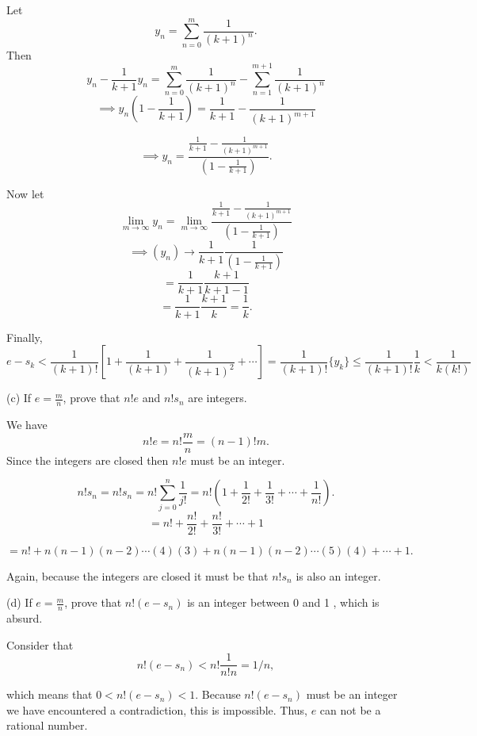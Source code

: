 \documentclass{report}
\begin{document}
\begin{myproof}
  Let $$ y_n = \sum_{n=0}^{m} \frac{1}{(k+1)^n} .$$ Then $$y_n - \frac{1}{k+1} y_n = \sum_{n=0}^{m} \frac{1}{(k+1)^n} - \sum_{n=1}^{m+1} \frac{1}{(k+1)^n} $$ 
  $$\implies y_n\left(1 - \frac{1}{k+1}\right) = \frac{1}{k+1} - \frac{1}{(k+1)^{m+1}} $$   

$$\implies y_n = \frac{\frac{1}{k+1} - \frac{1}{(k+1)^{m+1}}}{\left(1 - \frac{1}{k+1}\right)}.$$


Now let $$ \lim_{m \rightarrow \infty} y_n = \lim_{m \rightarrow \infty}\frac{\frac{1}{k+1} - \frac{1}{(k+1)^{m+1}}}{\left(1 - \frac{1}{k+1}\right)}$$
$$ \implies (y_n) \rightarrow \frac{1}{k+1}\frac{1}{\left(1 - \frac{1}{k+1}\right)}$$
$$  = \frac{1}{k+1}\frac{k+1}{k+1-1}$$
$$  = \frac{1}{k+1}\frac{k+1}{k} = \frac{1}{k}.$$


Finally, $$ e - s_k  < \frac{1}{(k+1)!}\left[1 + \frac{1}{(k+1)}  + \frac{1}{(k+1)^2} + \cdots \right] = \frac{1}{(k+1)!}\{y_k\} \leq \frac{1}{(k+1)!} \frac{1}{k} < \frac{1}{k(k!)}$$
\end{myproof}

\bigskip

(c) If $e=\frac{m}{n}$, prove that $n ! e$ and $n ! s_n$ are integers.

\begin{myproof}

We have $$ n!e = n!\frac{m}{n} = (n-1)!m.$$ Since the integers are closed then $n!e$ must be an integer. 
    
\end{myproof}

\begin{myproof}

$$ n!s_n = n!s_n= n!\sum_{j=0}^n \frac{1}{j!} = n!\left(1 + \frac{1}{2!} + \frac{1}{3!}+ \cdots +\frac{1}{n!}\right) .$$
$$ = n! + \frac{n!}{2!} + \frac{n!}{3!}+ \cdots + 1$$

$$ = n! + n(n-1)(n-2)\cdots(4)(3) + n(n-1)(n-2)\cdots(5)(4)+ \cdots + 1 .$$

Again, because the integers are closed  it must be that $n!s_n$ is also an integer.

\end{myproof}

\bigskip
(d) If $e=\frac{m}{n}$, prove that $n!\left(e-s_n\right)$ is an integer between 0 and 1 , which is absurd.

\bigskip
\begin{myproof}

Consider that $$n!\left(e-s_n\right) < n!\frac{1}{n!n}= 1/n,$$

which means that $0< n!\left(e-s_n\right) <1.$  Because  $n!(e-s_n)$ must be an integer we have encountered a contradiction, this is impossible. Thus, $e$ can not be a rational number.
    
\end{myproof}
\bigskip
\pagebreak
{}
\end{document}
